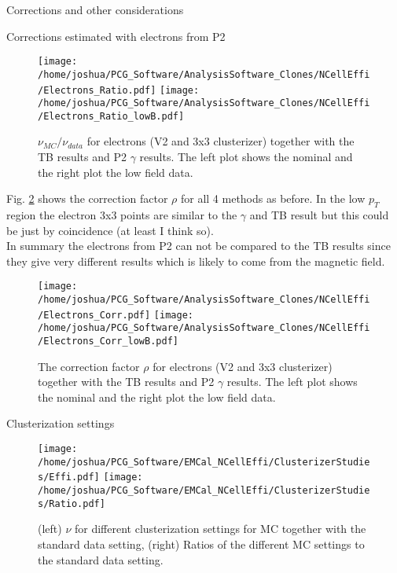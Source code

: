 \documentclass[ALICE]{ALICE_analysis_notes}
\begin{document}
\begin{section}{Corrections and other considerations}
\begin{subsection}{Corrections estimated with electrons from P2}
\begin{figure}[ht!]
	\centering
	\texttt{[image: /home/joshua/PCG\_Software/AnalysisSoftware\_Clones/NCellEffi/Electrons\_Ratio.pdf]}	
	\texttt{[image: /home/joshua/PCG\_Software/AnalysisSoftware\_Clones/NCellEffi/Electrons\_Ratio\_lowB.pdf]}
	
	\caption{  $\nu_{MC}/\nu_{data}$ for electrons (V2 and 3x3 clusterizer) together with the TB results and P2 $\gamma$ results. The left plot shows the nominal and the right plot the low field data.   }
	\label{fig:electrons_Ratio}
\end{figure}

Fig. \ref{fig:electrons_Corr} shows the correction factor $\rho$ for all 4 methods as before. In the low $p_{T}$ region the electron 3x3 points are similar to the $\gamma$ and TB result but this could be just by coincidence (at least I think so).\\
In summary the electrons from P2 can not be compared to the TB results since they give very different results which is likely to come from the magnetic field.
\begin{figure}[ht!]
	\centering
	\texttt{[image: /home/joshua/PCG\_Software/AnalysisSoftware\_Clones/NCellEffi/Electrons\_Corr.pdf]}	
	\texttt{[image: /home/joshua/PCG\_Software/AnalysisSoftware\_Clones/NCellEffi/Electrons\_Corr\_lowB.pdf]}
	
	\caption{  The correction factor $\rho$ for electrons (V2 and 3x3 clusterizer) together with the TB results and P2 $\gamma$ results. The left plot shows the nominal and the right plot the low field data.   }
	\label{fig:electrons_Corr}
\end{figure}

\end{subsection}
\newpage
\begin{subsection}{Clusterization settings}
	\begin{figure}[ht!]
		\centering
		\texttt{[image: /home/joshua/PCG\_Software/EMCal\_NCellEffi/ClusterizerStudies/Effi.pdf]}	
		\texttt{[image: /home/joshua/PCG\_Software/EMCal\_NCellEffi/ClusterizerStudies/Ratio.pdf]}
		
		\caption{  (left) $\nu$ for different clusterization settings for MC together with the standard data setting, (right) Ratios of the different MC settings to the standard data setting.  }
		\label{fig:clusterization}
	\end{figure}


\end{subsection}
\end{section}
\end{document}
